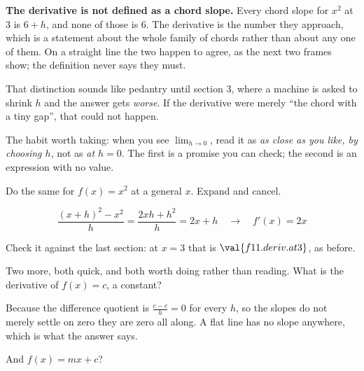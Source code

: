 \begin{fr}
\begin{trapbox}
\textbf{The derivative is not defined as a chord slope.} Every chord slope
for $x^{2}$ at $3$ is $6 + h$, and none of those is $6$. The derivative is the
number they approach, which is a statement about the whole family of chords
rather than about any one of them. On a straight line the two happen to agree,
as the next two frames show; the definition never says they must.

That distinction sounds like pedantry until section 3, where a machine is
asked to shrink $h$ and the answer gets \emph{worse}. If the derivative were
merely \enquote{the chord with a tiny gap}, that could not happen.

The habit worth taking: when you see $\lim_{h \to 0}$, read it as
\emph{as close as you like, by choosing $h$}, not as \emph{at $h = 0$}. The
first is a promise you can check; the second is an expression with no value.
\end{trapbox}

Do the same for $f(x) = x^{2}$ at a general $x$. Expand and cancel.
\nextframe
\end{fr}

\begin{fr}
\begin{ansblock}
\[ \frac{(x+h)^{2} - x^{2}}{h} = \frac{2xh + h^{2}}{h} = 2x + h
   \quad\longrightarrow\quad f'(x) = 2x \]
\end{ansblock}

Check it against the last section: at $x = 3$ that is
$\val{f11.deriv.at3}$, as before.

Two more, both quick, and both worth doing rather than reading. What is the
derivative of $f(x) = c$, a constant?
\nextframe
\end{fr}

\begin{fr}
Because the difference quotient is $\frac{c - c}{h} = 0$ for every $h$, so the
slopes do not merely settle on zero \dash{} they are zero all along. A flat
line has no slope anywhere, which is what the answer says.

And $f(x) = mx + c$?
\nextframe
\end{fr}

